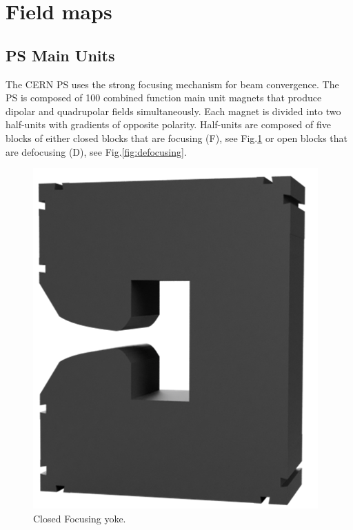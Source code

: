 \documentclass[a4paper,
               biblatex,     %
               keeplastbox,   %
               ]{jacow}
\begin{document}
\section{Field maps}
\subsection{PS Main Units}
The CERN PS uses the strong focusing mechanism for beam convergence. The PS is composed of 100 combined function main unit magnets that produce dipolar and quadrupolar fields simultaneously. Each magnet is divided into two half-units with gradients of opposite polarity. Half-units are composed of five blocks of either closed blocks that are focusing (F), see Fig.\ref{fig:focusing} or open blocks that are defocusing (D), see Fig.\ref{fig:defocusing}.

\begin{figure}[!htb]
  \centering
  \begin{minipage}[b]{0.45\columnwidth}
    \includegraphics*[width=\textwidth]{MOPOTK030_f1.png}
    \caption{Closed Focusing yoke.}
    \label{fig:focusing}
  \end{minipage}

\end{figure}
\end{document}
